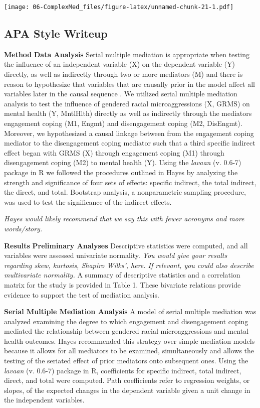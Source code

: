 \documentclass[
  11pt,
]{book}
\begin{document}
\texttt{[image: 06-ComplexMed\_files/figure-latex/unnamed-chunk-21-1.pdf]}

\hypertarget{apa-style-writeup-2}{%
\subsection{APA Style Writeup}\label{apa-style-writeup-2}}

\textbf{Method} \textbf{Data Analysis} Serial multiple mediation is appropriate when testing the influence of an independent variable (X) on the dependent variable (Y) directly, as well as indirectly through two or more mediators (M) and there is reason to hypothesize that variables that are causally prior in the model affect all variables later in the causal sequence \citep{hayes_introduction_2018}. We utilized serial multiple mediation analysis to test the influence of gendered racial microaggressions (X, GRMS) on mental health (Y, MntlHlth) directly as well as indirectly through the mediators engagement coping (M1, Engmt) and disengagement coping (M2, DisEngmt). Moreover, we hypothesized a causal linkage between from the engagement coping mediator to the disengagement coping mediator such that a third specific indirect effect began with GRMS (X) through engagement coping (M1) through disengagement coping (M2) to mental health (Y). Using the \emph{lavaan} (v. 0.6-7) package in R we followed the procedures outlined in Hayes \citeyearpar{hayes_introduction_2018} by analyzing the strength and significance of four sets of effects: specific indirect, the total indirect, the direct, and total. Bootstrap analysis, a nonparametric sampling procedure, was used to test the significance of the indirect effects.

\emph{Hayes would likely recommend that we say this with fewer acronyms and more words/story.}

\textbf{Results} \textbf{Preliminary Analyses} Descriptive statistics were computed, and all variables were assessed univariate normality. \emph{You would give your results regarding skew, kurtosis, Shapiro Wilks', here. If relevant, you could also describe multivariate normality.} A summary of descriptive statistics and a correlation matrix for the study is provided in Table 1. These bivariate relations provide evidence to support the test of mediation analysis.

\textbf{Serial Multiple Mediation Analysis} A model of serial multiple mediation was analyzed examining the degree to which engagement and disengagement coping mediated the relationship between gendered racial microaggressions and mental health outcomes. Hayes \citeyearpar{hayes_introduction_2018} recommended this strategy over simple mediation models because it allows for all mediators to be examined, simultaneously and allows the testing of the seriated effect of prior mediators onto subsequent ones. Using the \emph{lavaan} (v. 0.6-7) package in R, coefficients for specific indirect, total indirect, direct, and total were computed. Path coefficients refer to regression weights, or slopes, of the expected changes in the dependent variable given a unit change in the independent variables.
\end{document}
